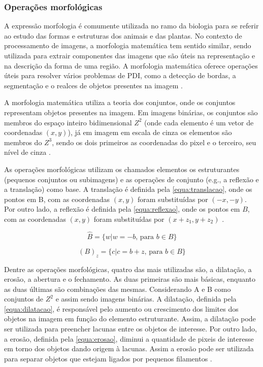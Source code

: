 \documentclass[12pt, a4paper, english, brazil]{article}
\begin{document}
\subsubsection{Operações morfológicas}

A expressão morfologia é comumente utilizada no ramo da biologia para se referir ao estudo das formas e estruturas dos animais e das plantas. No contexto de processamento de imagens, a morfologia matemática tem sentido similar, sendo utilizada para extrair componentes das imagens que são úteis na representação e na descrição da forma de uma região. A morfologia matemática oferece operações úteis para resolver vários problemas de PDI, como a detecção de bordas, a segmentação e o realces de objetos presentes na imagem \cite{Marques_Filho_1999}.

A morfologia matemática utiliza a teoria dos conjuntos, onde os conjuntos representam objetos presentes na imagem. Em imagens binárias, os conjuntos são membros do espaço inteiro bidimensional $Z^2$ (onde cada elemento é um vetor de coordenadas $(x, y)$), já em imagem em escala de cinza os elementos são membros do $Z^3$, sendo os dois primeiros as coordenadas do pixel e o terceiro, seu nível de cinza \cite{Gonzalez_Woods_2010}.

As operações morfológicas utilizam os chamados elementos os estruturantes (pequenos conjuntos ou subimagens) e as operações de conjunto (e.g., a reflexão e a translação) como base. A translação é definida pela \autoref{equa:translacao}, onde os pontos em B, com as coordenadas $(x, y)$ foram substituídas por $(-x, -y)$. Por outro lado, a reflexão é definida pela \autoref{equa:reflexao}, onde os pontos em $B$, com as coordenadas $(x, y)$ foram substituídas por
$(x + z_1, y + z_2)$ \cite{AlAzawee_2015}.

\begin{equation}
    \hat{B} = \{w | w = -b\text{, para } b \in B\}
    \label{equa:translacao}
\end{equation}

\begin{equation}
    (B)_z = \{c | c = b + z\text{, para } b \in B\}
    \label{equa:reflexao}
\end{equation}

Dentre as operações morfológicas, quatro das mais utilizadas são, a dilatação, a erosão, a abertura e o fechamento. As duas primeiras são mais básicas, enquanto as duas últimas são combinações das mesmas. Considerando A e B como conjuntos de $Z^2$ e assim sendo imagens binárias. A dilatação, definida pela \autoref{equa:dilatacao}, é responsável pelo aumento ou crescimento dos limites dos objetos na imagem em função do elemento estruturante. Assim, a dilatação pode ser utilizada para preencher lacunas entre os objetos de interesse. Por outro lado, a erosão, definida pela \autoref{equa:erosao}, diminui a quantidade de pixeis de interesse em torno dos objetos dando origem à lacunas. Assim a erosão pode ser utilizada para separar objetos que estejam ligados por pequenos filamentos \cite{Marques_Filho_1999}.
\end{document}
